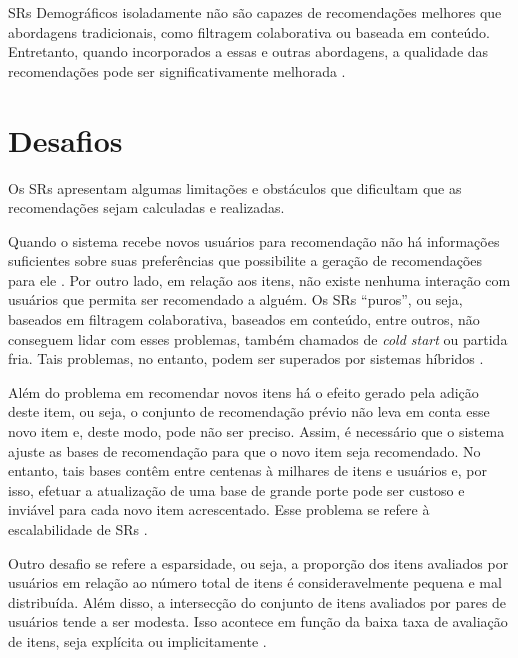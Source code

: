     SRs Demográficos isoladamente não são capazes de recomendações melhores que abordagens tradicionais, como filtragem colaborativa ou baseada em conteúdo. Entretanto, quando incorporados a essas e outras abordagens, a qualidade das recomendações pode ser  significativamente melhorada \cite{Aggarwal2016}. 


\section{Desafios} \label{sec:desafios}

    
    Os SRs apresentam algumas limitações e obstáculos que dificultam que as recomendações sejam calculadas e realizadas. 
    
    Quando o sistema recebe novos usuários para recomendação não há informações suficientes sobre suas preferências que possibilite a geração de recomendações para ele \cite{Bobadilla_2013}. Por outro lado, em relação aos itens, não existe nenhuma interação com usuários que permita ser recomendado a alguém. Os SRs ``puros'', ou seja, baseados em filtragem colaborativa, baseados em conteúdo, entre outros, não conseguem lidar com esses problemas, também chamados de \textit{cold start} ou partida fria. Tais problemas, no entanto, podem ser superados por sistemas híbridos \cite{Miranda2010}.
    
    Além do problema em recomendar novos itens há o efeito gerado pela adição deste item, ou seja, o conjunto de recomendação prévio não leva em conta esse novo item e, deste modo, pode não ser preciso. Assim, é necessário que o sistema ajuste as bases de recomendação para que o novo item seja recomendado. No entanto, tais bases contêm entre centenas à milhares de itens e usuários e, por isso, efetuar a atualização de uma base de grande porte pode ser custoso e inviável para cada novo item acrescentado. Esse problema se refere à escalabilidade de SRs \cite{Lue2012}. 
    
    Outro desafio se refere a esparsidade, ou seja, a proporção dos itens avaliados por usuários em relação ao número total de itens é consideravelmente pequena e mal distribuída. Além disso, a intersecção do conjunto de itens avaliados por pares de usuários tende a ser modesta. Isso acontece em função da baixa taxa de avaliação de itens, seja explícita ou implicitamente \cite{Lue2012, Sharma2017}.

